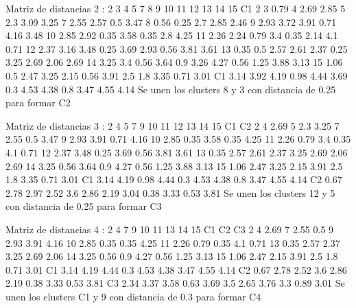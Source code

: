 \documentclass[a4paper, 12pt]{article}
\begin{document}
\begin{itemize}
\begin{Schunk}
\begin{Soutput}
Matriz de distancias 2 :
   2    3    4    5    7    8    9    10   11   12   13   14   15   C1
2                                                                     
3  0.79                                                               
4  2.69 2.85                                                          
5  2.3  3.09 3.25                                                     
7  2.55 2.57 0.5  3.47                                                
8  0.56 0.25 2.7  2.85 2.46                                           
9  2.93 3.72 3.91 0.71 4.16 3.48                                      
10 2.85 2.92 0.35 3.58 0.35 2.8  4.25                                 
11 2.26 2.24 0.79 3.4  0.35 2.14 4.1  0.71                            
12 2.37 3.16 3.48 0.25 3.69 2.93 0.56 3.81 3.61                       
13 0.35 0.5  2.57 2.61 2.37 0.25 3.25 2.69 2.06 2.69                  
14 3.25 3.4  0.56 3.64 0.9  3.26 4.27 0.56 1.25 3.88 3.13             
15 1.06 0.5  2.47 3.25 2.15 0.56 3.91 2.5  1.8  3.35 0.71 3.01        
C1 3.14 3.92 4.19 0.98 4.44 3.69 0.3  4.53 4.38 0.8  3.47 4.55 4.14   
Se unen los clusters 8 y 3 con distancia de 0.25 para formar C2 

Matriz de distancias 3 :
   2    4    5    7    9    10   11   12   13   14   15   C1   C2
2                                                                
4  2.69                                                          
5  2.3  3.25                                                     
7  2.55 0.5  3.47                                                
9  2.93 3.91 0.71 4.16                                           
10 2.85 0.35 3.58 0.35 4.25                                      
11 2.26 0.79 3.4  0.35 4.1  0.71                                 
12 2.37 3.48 0.25 3.69 0.56 3.81 3.61                            
13 0.35 2.57 2.61 2.37 3.25 2.69 2.06 2.69                       
14 3.25 0.56 3.64 0.9  4.27 0.56 1.25 3.88 3.13                  
15 1.06 2.47 3.25 2.15 3.91 2.5  1.8  3.35 0.71 3.01             
C1 3.14 4.19 0.98 4.44 0.3  4.53 4.38 0.8  3.47 4.55 4.14        
C2 0.67 2.78 2.97 2.52 3.6  2.86 2.19 3.04 0.38 3.33 0.53 3.81   
Se unen los clusters 12 y 5 con distancia de 0.25 para formar C3 

Matriz de distancias 4 :
   2    4    7    9    10   11   13   14   15   C1   C2   C3
2                                                           
4  2.69                                                     
7  2.55 0.5                                                 
9  2.93 3.91 4.16                                           
10 2.85 0.35 0.35 4.25                                      
11 2.26 0.79 0.35 4.1  0.71                                 
13 0.35 2.57 2.37 3.25 2.69 2.06                            
14 3.25 0.56 0.9  4.27 0.56 1.25 3.13                       
15 1.06 2.47 2.15 3.91 2.5  1.8  0.71 3.01                  
C1 3.14 4.19 4.44 0.3  4.53 4.38 3.47 4.55 4.14             
C2 0.67 2.78 2.52 3.6  2.86 2.19 0.38 3.33 0.53 3.81        
C3 2.34 3.37 3.58 0.63 3.69 3.5  2.65 3.76 3.3  0.89 3.01   
Se unen los clusters C1 y 9 con distancia de 0.3 para formar C4 


\end{Soutput}
\end{Schunk}
\end{itemize}
\end{document}
